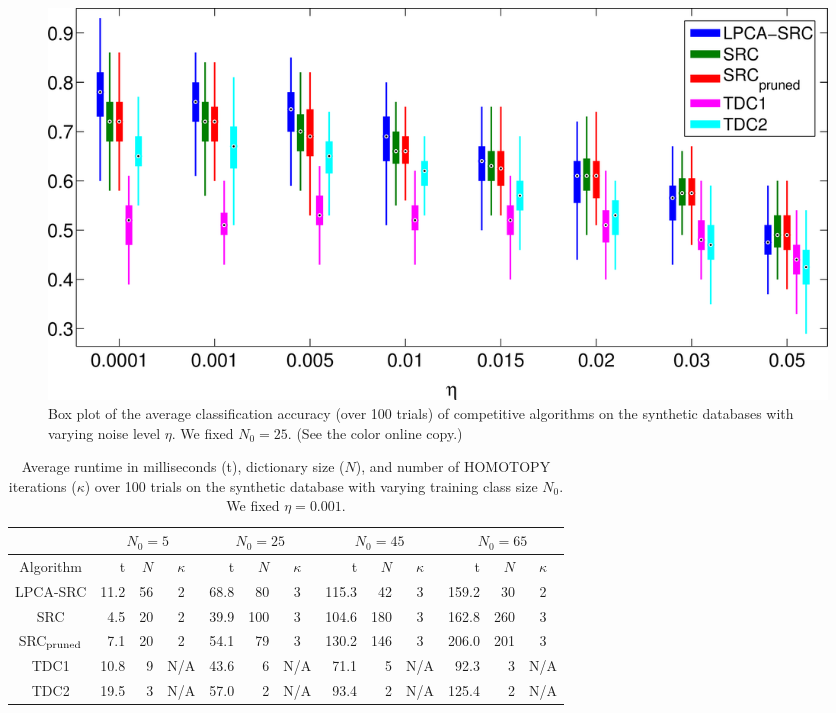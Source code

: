 \documentclass[review]{elsarticle}
\begin{document}
\begin{figure}[t]
\begin{center}
\includegraphics[width=0.95\linewidth]{Fig_3}
\caption{Box plot of the average classification accuracy (over 100 trials) of competitive algorithms on the synthetic databases with varying noise level $\eta$. We fixed $N_0 = 25$. (See the color online copy.)}
\label{syn_data_set_varying_noise}
\end{center}
\end{figure}

\begin{table}[!htb] 
\small{
\centering
\begin{tabular}{|c|r|r|c|r|r|c|r|r|c|r|r|c|}
\hline
& \multicolumn{3}{|c|}{$N_0 = 5$}    & \multicolumn{3}{|c|}{$N_0 = 25$}   & \multicolumn{3}{|c|}{$N_0 = 45$}    & \multicolumn{3}{|c|}{$N_0 = 65$}   \\
\hline
Algorithm & t & $N$ & $\kappa$ & t & $N$ & $\kappa$ & t & $N$ & $\kappa$ & t & $N$ & $\kappa$ \\
\hline
LPCA-SRC	&	11.2	&	56	&	2	&	68.8	&	80	&	3	&	115.3	&	42	&	3	&	159.2	&	30	&	2	\\
SRC	      &	4.5	&	20	  &	2	&	39.9	&	100	&	3	&	104.6	&	180	&	3	&	162.8	&	260	&	3	\\
SRC$_\mathrm{\textnormal{pruned}}$	&	7.1	&	20	&	2	&	54.1	&	79	&	3	&	130.2	&	146	&	3	&	206.0	&	201	&	3	\\
TDC1	    &	10.8	&	9	&	N/A	&	43.6	&	6	&	N/A	&	71.1	&	5	&	N/A	&	92.3	&	3	&	N/A	\\
TDC2	    &	19.5	&	3	&	N/A	&	57.0	&	2	&	N/A	&	93.4	&	2	&	N/A	&	125.4	&	2	&	N/A	\\
\hline
\end{tabular}
\caption{Average runtime in milliseconds (t), dictionary size ($N$), and number of HOMOTOPY iterations ($\kappa$) over 100 trials on the synthetic database with varying training class size $N_0$. We fixed $\eta = 0.001$.}
\label{table:syn_time}}
\end{table}
\end{document}

